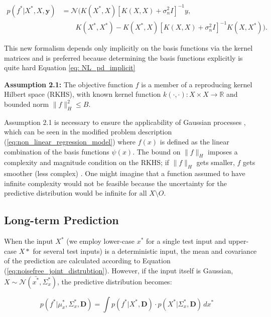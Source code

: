 \begin{equation}\label{eq: NL_pd_implicit}
\begin{aligned}
p(f^*|X^*,X,\mathbf{y}) & = \mathcal{N} (K(X^*,X) [K(X,X) + \sigma^2_n I]^{-1} y,  \nonumber \\
& \qquad  K(X^*,X^*) - K(X^*,X)[K(X,X) + \sigma^2_n I]^{-1} K(X,X^*)).
\end{aligned}
\end{equation}

This new formalism depends only implicitly on the basis functions via the kernel matrices and is preferred because determining the basis functions explicitly is quite hard Equation \ref{eq: NL_pd_implicit}


\textbf{Assumption 2.1:}\label{as:assumption2.1} The objective function $f$ is a member of a reproducing kernel Hilbert space (RKHS), with known kernel function $k(\cdot,\cdot) : X \times X \rightarrow \mathbb{R}$ and bounded norm $\|f\|_H^2 \leq B$. 


Assumption 2.1 is necessary to ensure the applicability of Gaussian processes \cite{williams2006gaussian}, which can be seen in the modified problem description (\ref{eq:non_linear_regression_model}) where $f(x)$ is defined as the linear combination of the basis functions $\psi(x)$. The bound on $\|f\|_H$ imposes a complexity and magnitude condition on the RKHS; if $\|f\|_H$ gets smaller, $f$ gets smoother (less complex) \cite{kanagawa2018}. One might imagine that a function assumed to have infinite complexity would not be feasible because the uncertainty for the predictive distribution would be infinite for all $X \setminus O$.


\subsection{Long-term Prediction}\label{sec:section2.3}
When the input \( X^* \) (we employ lower-case \( x^* \) for a single test input and upper-case \( X* \) for several test inputs) is a deterministic input, the mean and covariance of the prediction are calculated according to Equation (\ref{eq:noisefree_joint_distrubtion}). However, if the input itself is Gaussian, \( X \sim \mathcal{N}( \bar{x^*}, \Sigma_x^* ) \), the predictive distribution becomes:

\begin{equation}\label{eq:single_prediciton}
p(f^*|\mu_x^*, \Sigma_x^* , \mathbf{D}) = \int p(f^*|X^*, \mathbf{D}) \cdot p(X^*|\Sigma_x^* , \mathbf{D}) \, dx^* \quad
\end{equation}

